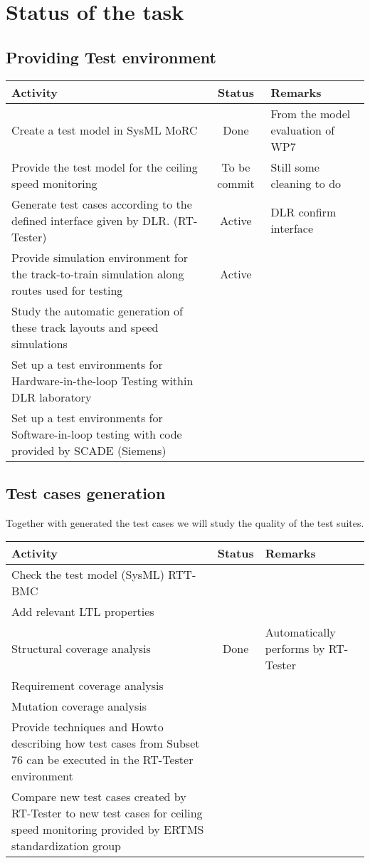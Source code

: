 \documentclass[11pt, a4paper]{article}
\begin{document}
\section{Status of the task}
\subsection{Providing Test environment}
\begin{tabular}{p{}cp{}}\toprule
Activity & Status & Remarks \\\midrule
 Create a test model in SysML MoRC & Done &  From the model evaluation
 of WP7\\\midrule
Provide the test model for the ceiling speed monitoring & To be
commit & Still some cleaning to do \\\midrule
Generate test cases according to the defined interface given by
  DLR. (RT-Tester) & Active & DLR confirm interface \\ \midrule
Provide simulation environment for the
  track-to-train simulation  along routes used
  for testing & Active & \\\midrule
Study the automatic generation of these track layouts and speed
  simulations & & \\\midrule
Set up a test environments for
Hardware-in-the-loop Testing within DLR laboratory & & \\\midrule
Set up a test environments for Software-in-loop testing with code
provided by SCADE (Siemens) & & \\
\bottomrule
\end{tabular}

\subsection{Test cases generation}
Together with generated the test cases we will study the quality of
the test suites.

\begin{tabular}{p{}cp{}}\toprule
Activity & Status & Remarks \\\midrule
Check the test model (SysML) RTT-BMC  &&\\\midrule
Add relevant LTL properties &&\\\midrule
Structural coverage analysis & Done & Automatically performs by  RT-Tester\\\midrule
 Requirement coverage analysis &&\\\midrule
 Mutation coverage  analysis &&\\\midrule
 Provide techniques and Howto describing how test cases from
  Subset 76 can be executed in the RT-Tester environment &&\\\midrule
 Compare new test cases created by RT-Tester to new test cases
  for ceiling speed monitoring provided by ERTMS standardization
  group &&\\
\bottomrule
\end{tabular}
\end{document}
